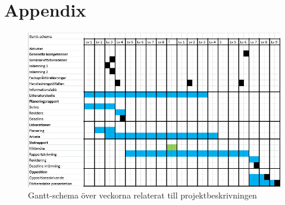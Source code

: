 
%


\newpage
{}











\newpage
\printbibliography
\thispagestyle{empty}
\newpage
\appendix
\section{Appendix} \label{appendix}
\begin{figure}[H]
    \centering
    \includegraphics[scale=0.8]{Ganttliten.PNG}
    \caption{Gantt-schema över veckorna relaterat till projektbeskrivningen}
    \label{fig:Ganttliten}
\end{figure}

